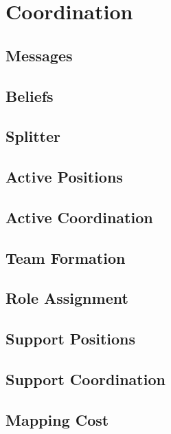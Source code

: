 \chapter{Coordination}
\label{Coordination}

\section{Messages}
\section{Beliefs}
\section{Splitter}
\section{Active Positions}
\section{Active Coordination}
\section{Team Formation}
\section{Role Assignment}
\section{Support Positions}
\section{Support Coordination}
\section{Mapping Cost}